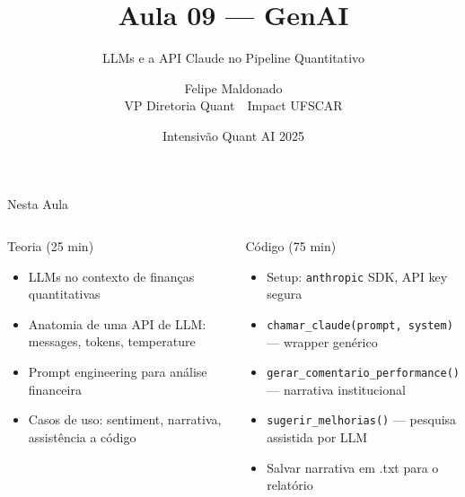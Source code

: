 \documentclass[aspectratio=169,12pt]{beamer}
\author{Felipe Maldonado\\{\scriptsize VP Diretoria Quant~\textbullet{}~Impact UFSCAR}}
\date{Intensivão Quant AI 2025}
\title{Aula 09 --- GenAI}
\subtitle{LLMs e a API Claude no Pipeline Quantitativo}
\begin{document}
\begin{frame}[plain]
\titlepage
\end{frame}

\begin{frame}[fragile]{Nesta Aula}
\begin{columns}[T]
\begin{block}{Teoria (25 min)}
\begin{itemize}
  \item LLMs no contexto de finanças quantitativas
  \item Anatomia de uma API de LLM: messages, tokens, temperature
  \item Prompt engineering para análise financeira
  \item Casos de uso: sentiment, narrativa, assistência a código
\end{itemize}
\end{block}
\begin{block}{Código (75 min)}
\begin{itemize}
  \item Setup: \texttt{anthropic} SDK, API key segura
  \item \texttt{chamar\_claude(prompt, system)} — wrapper genérico
  \item \texttt{gerar\_comentario\_performance()} — narrativa institucional
  \item \texttt{sugerir\_melhorias()} — pesquisa assistida por LLM
  \item Salvar narrativa em .txt para o relatório
\end{itemize}
\end{block}
\end{columns}
\end{frame}
\end{document}
